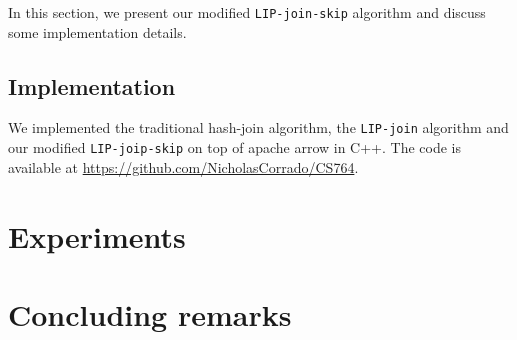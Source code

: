 \documentclass[11pt]{article}
\begin{document}
In this section, we present our modified \texttt{LIP-join-skip} algorithm and discuss some implementation details.

\subsection{Implementation}

We implemented the traditional hash-join algorithm, the \texttt{LIP-join} algorithm and our modified \texttt{LIP-joip-skip} on top of apache arrow in C++. The code is available at \url{https://github.com/NicholasCorrado/CS764}.


\section{Experiments}


\begin{comment}
\section{Deploying lookahead filters in distributed systems}

In this section we discuss a method to deploy the LIP filters in distributed systems. This method incorporates LIP and the \textsc{hypercube} algorithm \cite{zhu2017looking,}.


Let $p$ be the number of machines available. Let $k_i$ be the primary key of $D_i$, and each tuple in the fact table $F$ possesses a foreign key to each $D_i$. Suppose $p = \prod_{1 \leq i \leq n} p_i$,  and then we label each of the $p$ machines with a coordinate $(x_1, x_2, \dots, x_n)$ where each $1 \leq x_i \leq p_i$.

We first pick $n$ hash functions $h_i$ such that the range of each $h_i$ is $\{1, 2, \dots, p_i\}$. Then for each dimension table $D_i$ and for each primary key $k_i$ in $D_i$, we send $k_i$ to all machines with $i$-th component being $h_i(k_i)$. 

\end{comment}


\section{Concluding remarks}




{}

\end{document}
